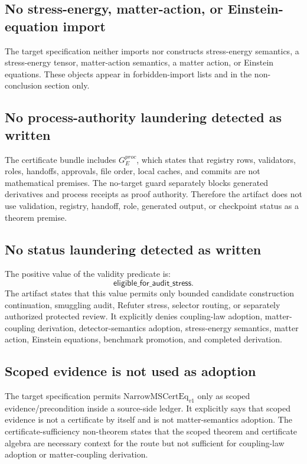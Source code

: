 \documentclass[11pt]{article}
\begin{document}
\subsection{No stress-energy, matter-action, or Einstein-equation import}

The target specification neither imports nor constructs stress-energy
semantics, a stress-energy tensor, matter-action semantics, a matter action,
or Einstein equations. These objects appear in forbidden-import lists and in
the non-conclusion section only.

\subsection{No process-authority laundering detected as written}

The certificate bundle includes \(G^{proc}_E\), which states that registry
rows, validators, roles, handoffs, approvals, file order, local caches, and
commits are not mathematical premises. The no-target guard separately blocks
generated derivatives and process receipts as proof authority. Therefore the
artifact does not use validation, registry, handoff, role, generated output,
or checkpoint status as a theorem premise.

\subsection{No status laundering detected as written}

The positive value of the validity predicate is:
\[
  \mathsf{eligible\_for\_audit\_stress}.
\]
The artifact states that this value permits only bounded candidate
construction continuation, smuggling audit, Refuter stress, selector routing,
or separately authorized protected review. It explicitly denies coupling-law
adoption, matter-coupling derivation, detector-semantics adoption,
stress-energy semantics, matter action, Einstein equations, benchmark
promotion, and completed derivation.

\subsection{Scoped evidence is not used as adoption}

The target specification permits \(\mathrm{NarrowMSCertEq}_{v1}\) only as
scoped evidence/precondition inside a source-side ledger. It explicitly says
that scoped evidence is not a certificate by itself and is not
matter-semantics adoption. The certificate-sufficiency non-theorem states
that the scoped theorem and certificate algebra are necessary context for the
route but not sufficient for coupling-law adoption or matter-coupling
derivation.
\end{document}
